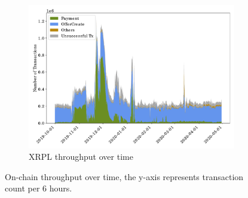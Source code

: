 \begin{figure}[tbp]
\begin{subfigure}{\columnwidth}
		\includegraphics[height=.27\textheight]{./4-transactions-security/figures/xrp-chart-area.pdf}
		\caption{XRPL throughput over time}
		\label{fig:xrp-throughput-time}
	\end{subfigure}
	\caption[On-chain throughput over time]{On-chain throughput over time, the y-axis represents transaction count per 6 hours.}
	\label{fig:throughput-time}
\end{figure}

